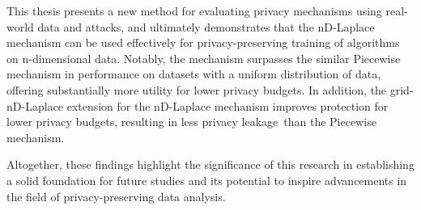 This thesis presents a new method for evaluating privacy mechanisms using real-world data and attacks, and ultimately demonstrates that the nD-Laplace mechanism can be used effectively for privacy-preserving training of algorithms on n-dimensional data. Notably, the mechanism surpasses the similar Piecewise mechanism in performance on datasets with a uniform distribution of data, offering substantially more utility for lower privacy budgets. In addition, the grid-nD-Laplace extension for the nD-Laplace mechanism improves protection for lower privacy budgets, resulting in less privacy leakage than the Piecewise mechanism. 

Altogether, these findings highlight the significance of this research in establishing a solid foundation for future studies and its potential to inspire advancements in the field of privacy-preserving data analysis.

